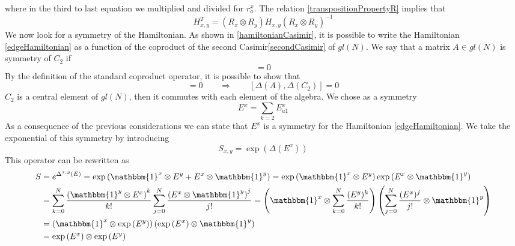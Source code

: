 \documentclass[11pt]{article}
\numberwithin{equation}{section}
\numberwithin{equation}{subsection}
\begin{document}
where in the third to last equation we multiplied and divided for $r_{a}^{x}$. 
The relation \eqref{transpositionPropertyR} implies that 
\begin{equation}
    H_{x,y}^{T}=\left(R_{x}\otimes R_{y}\right)H_{x,y}\left(R_{x}\otimes R_{y}\right)^{-1}
\end{equation}
We now look for a symmetry of the Hamiltonian. As shown in \eqref{hamiltonianCasimir}, it is possible to write the Hamiltonian \eqref{edgeHamiltonian} as a function of the coproduct of the second Casimir\eqref{secondCasimir} of $gl(N)$. We say that a matrix $A\in gl(N)$ is symmetry of $C_{2}$ if
\begin{equation}
    [A,C_{2}]=0
\end{equation}
By the definition of the standard coproduct operator, it is possible to show that
\begin{equation}
    [A,C_{2}]=0\qquad \Longrightarrow \qquad \left[\Delta(A),\Delta(C_{2})\right]=0
\end{equation}
 $C_{2}$ is a central element of $gl(N)$, then it commutes with each element of the algebra. 
We chose as a symmetry 
\begin{equation}\label{equationE}
    E^{x}=\sum_{k=2}E_{a1}^{x}
\end{equation}
As a consequence of the previous considerations we can state that $E^{x}$ is a symmetry for the Hamiltonian \eqref{edgeHamiltonian}. We take the exponential of this symmetry by introducing
\begin{equation}\label{symmetry}
    S_{x,y}=\exp{(\Delta(E^{x}))}
\end{equation}
This operator can be rewritten as 
\begin{equation}
	\begin{split}
		S&=e^{\Delta^{x,y}(E)}=\exp{(\mathbbm{1}^{x}\otimes E^{y}+E^{x}\otimes \mathbbm{1}^{y})}=\exp{(\mathbbm{1}^{x}\otimes E^{y})} \exp{(E^{x}\otimes \mathbbm{1}^{y})}\\&=\sum_{k=0}^{N}\frac{\left(\mathbbm{1}^{y}\otimes E^{x}\right)^{k}}{k!}\sum_{j=0}^{N}\frac{\left(E^{x}\otimes \mathbbm{1}^{y}\right)^{j}}{j!}=
		\left(\mathbbm{1}^{x}\otimes \sum_{k=0}^{N}\frac{(E^{y})^{k}}{k!}\right)\left(\sum_{j=0}^{N}\frac{(E^{x})^{j}}{j!}\otimes \mathbbm{1}^{y}\right)\\&=\left(\mathbbm{1}^{x}\otimes \exp{({E}^{y})}\right)\left(\exp{(E^{x})}\otimes \mathbbm{1}^{y}\right)\\&=\exp{(E^{x})}\otimes \exp{(E^{y})}
	\end{split}
\end{equation}
\end{document}
